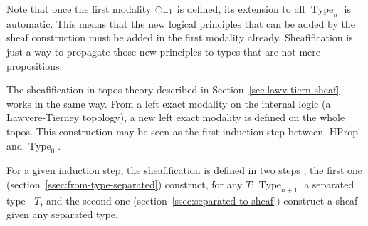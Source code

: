 \documentclass[preprint,9pt,numbers]{sigplanconf}
\newcommand{\mynote}[2]{
    \fbox{\bfseries\sffamily\scriptsize#1}
    {\small$\blacktriangleright$\textsf{\emph{#2}}$\blacktriangleleft$}~}
\newcommand\kq[1]{\mynote{KQ}{#1}}
\DeclareMathOperator{\Type}{Type}
\DeclareMathOperator{\HProp}{HProp}
\newcommand{\modal}{\ensuremath{\ocircle}}
\newcommand \separated {\mathop{\square_{n+1}} }
\newenvironment{mymath}[1][-0em]{%
  \newcommand\mymathaux{\vspace{#1}}%
  \vspace{#1}%
  \begin{equation*}%
  }{ %
    \mymathaux%
  \end{equation*}}
\begin{document}
\label{sec:sheaf-left-exact}Note that once the first modality $\modal_{-1}$ is defined, its
extension to all $\Type_n$ is automatic. This means that the new
logical principles that can be added by the sheaf construction must be
added in the first modality already. Sheafification is just a way
to propagate those new principles to types that are not mere
propositions.





The sheafification in topos theory described in
Section~\ref{sec:lawv-tiern-sheaf} works in the same way. 
%
From a left exact modality on the internal logic (a Lawvere-Tierney
topology), a new left exact modality is defined on the whole topos.
%
This construction may be seen as the first induction step between
$\HProp$ and $\Type_0$. 


For a given induction step, the sheafification is defined in two
steps ; the first one (section~\ref{ssec:from-type-separated}) construct, for any $T:\Type_{n+1}$ a separated
type $\separated T$, and the second one
(section~\ref{ssec:separated-to-sheaf}) construct a sheaf given any
separated type.


\end{document}
